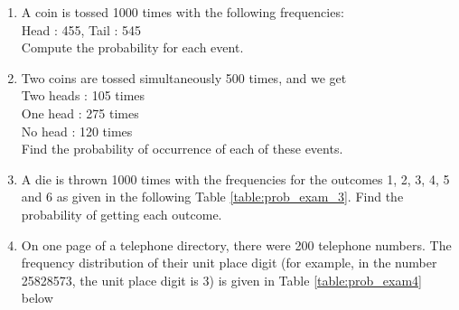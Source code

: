 \renewcommand{\theequation}{\theenumi}
\begin{enumerate}[label=\arabic*.,ref=\thesubsection.\theenumi]
	\item A coin is tossed 1000 times with the following frequencies:\\
Head : 455, Tail : 545\\
Compute the probability for each event.\\
\solution

   \item Two coins are tossed simultaneously 500 times, and we get\\
       Two heads : 105 times\\
       One head : 275 times\\
       No head : 120 times\\
Find the probability of occurrence of each of these events.\\
\solution

   \item A die is thrown 1000 times with the frequencies for the outcomes 1, 2, 3, 4, 5 and 6 as given in the following Table \ref{table:prob_exam_3}.
Find the probability of getting each outcome.

\begin{table}[!ht]
\centering
{}
\caption{}
\label{table:prob_exam_3}
\end{table}
\solution


   \item On one page of a telephone directory, there were 200 telephone numbers.
The frequency distribution of their unit place digit (for example, in the number 25828573, the unit place digit is 3) is given in Table \ref{table:prob_exam4}
below


\end{enumerate}
